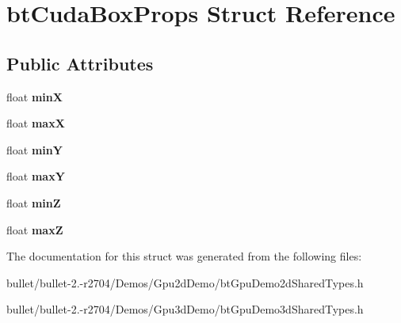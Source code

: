 \hypertarget{structbt_cuda_box_props}{\section{bt\+Cuda\+Box\+Props Struct Reference}
\label{structbt_cuda_box_props}
}
\subsection*{Public Attributes}
\begin{DoxyCompactItemize}
\item 
\hypertarget{structbt_cuda_box_props_a68af1f4dcee4c920e83ae24a0d65c1b7}{float {\bfseries min\+X}}\label{structbt_cuda_box_props_a68af1f4dcee4c920e83ae24a0d65c1b7}

\item 
\hypertarget{structbt_cuda_box_props_a48648a55e95c6bf08806ee7b0c3b89f1}{float {\bfseries max\+X}}\label{structbt_cuda_box_props_a48648a55e95c6bf08806ee7b0c3b89f1}

\item 
\hypertarget{structbt_cuda_box_props_ad7647ba61a5e976aba7d5f54794513fd}{float {\bfseries min\+Y}}\label{structbt_cuda_box_props_ad7647ba61a5e976aba7d5f54794513fd}

\item 
\hypertarget{structbt_cuda_box_props_a2c6b461ab0bdce1198f0a1b1583b4497}{float {\bfseries max\+Y}}\label{structbt_cuda_box_props_a2c6b461ab0bdce1198f0a1b1583b4497}

\item 
\hypertarget{structbt_cuda_box_props_aa72cab72bcfd9aa12b298c70f6be1477}{float {\bfseries min\+Z}}\label{structbt_cuda_box_props_aa72cab72bcfd9aa12b298c70f6be1477}

\item 
\hypertarget{structbt_cuda_box_props_a4cda0953c3cbeb07385dbf92cda93504}{float {\bfseries max\+Z}}\label{structbt_cuda_box_props_a4cda0953c3cbeb07385dbf92cda93504}

\end{DoxyCompactItemize}


The documentation for this struct was generated from the following files\+:\begin{DoxyCompactItemize}
\item 
bullet/bullet-\/2.-\/r2704/\+Demos/\+Gpu2d\+Demo/bt\+Gpu\+Demo2d\+Shared\+Types.\+h\item 
bullet/bullet-\/2.-\/r2704/\+Demos/\+Gpu3d\+Demo/bt\+Gpu\+Demo3d\+Shared\+Types.\+h\end{DoxyCompactItemize}
